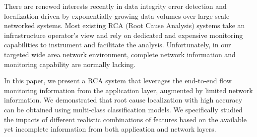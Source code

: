There are renewed interests recently in data integrity error detection and localization driven by exponentially growing data volumes 
over large-scale networked systems. Most existing RCA (Root Cause Analysis) systems take an infrastructure operator's view and rely on 
dedicated and expensive monitoring capabilities to instrument and facilitate the analysis. Unfortunately, in our targeted wide area network 
environment, complete network information and monitoring capability are normally lacking. 

In this paper, we present a RCA system that leverages the end-to-end flow monitoring information 
from the application layer, augmented by limited network information. We demonstrated that root cause localization with high accuracy 
can be obtained using multi-class classification models. We specifically studied the 
impacts of different realistic combinations of features based on the available yet incomplete information from both application and 
network layers. 

